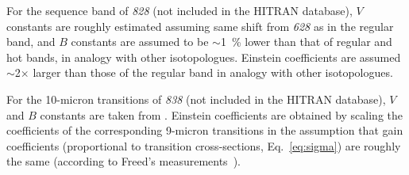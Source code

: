 \documentclass{report}
\begin{document}
\begin{appendices}
For the sequence band of \textit{828} (not included in the HITRAN database), $V$ constants are roughly estimated assuming same shift from \textit{628} as in the regular band, and $B$ constants are assumed to be $\sim$1~\% lower than that of regular and hot bands, in analogy with other isotopologues. Einstein coefficients are assumed $\sim$2$\times$ larger than those of the regular band in analogy with other isotopologues.

For the 10-micron transitions of \textit{838} (not included in the HITRAN database), $V$ and $B$ constants are taken from \cite{Maki-1994}. Einstein coefficients are obtained by scaling the coefficients of the corresponding 9-micron transitions in the assumption that gain coefficients (proportional to transition cross-sections, Eq.~\ref{eq:sigma}) are roughly the same (according to Freed's measurements~\cite{Freed-1982}).



\end{appendices}
\end{document}
